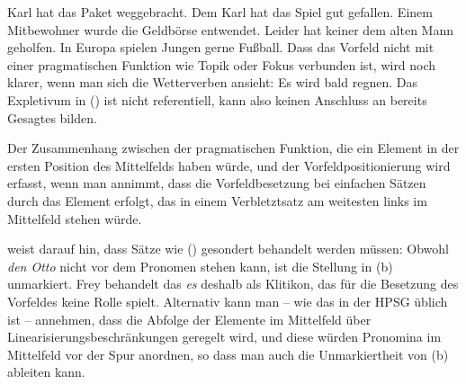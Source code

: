\eal
\label{bsp-voranstellung-pragmatik}
\ex Karl hat das Paket weggebracht.
\ex Dem Karl hat das Spiel gut gefallen.
\ex Einem Mitbewohner wurde die Geldbörse entwendet.
\ex Leider hat keiner dem alten Mann geholfen.
\ex In Europa spielen Jungen gerne Fußball.
\zl
Dass das Vorfeld nicht mit einer pragmatischen Funktion wie Topik oder Fokus verbunden ist,
wird noch klarer, wenn man sich die Wetterverben ansieht:
\ea
Es wird bald regnen.
\z
Das Expletivum in () ist nicht referentiell, kann also keinen Anschluss an bereits Gesagtes bilden.

Der Zusammenhang zwischen der pragmatischen Funktion, die ein Element in der ersten Position des Mittelfelds
haben würde, und der Vorfeldpositionierung wird erfasst, wenn man annimmt, 
dass die Vorfeldbesetzung bei einfachen Sätzen durch das Element erfolgt,
das in einem Verbletztsatz am weitesten links im Mittelfeld stehen würde.

\citet[]{Frey2004a} weist darauf hin, dass Sätze wie () gesondert behandelt werden müssen:
\eal
{}
\zl
Obwohl \emph{den Otto} nicht vor dem Pronomen stehen kann, ist die Stellung in (b) unmarkiert.
Frey behandelt das \emph{es} deshalb als Klitikon, das für die Besetzung des Vorfeldes keine Rolle
spielt. Alternativ kann man -- wie das in der HPSG üblich ist -- annehmen, dass die Abfolge der Elemente
im Mittelfeld über Linearisierungsbeschränkungen geregelt wird, und diese würden Pronomina im Mittelfeld
vor der Spur anordnen, so dass man auch die Unmarkiertheit von (b) ableiten kann.%
%
%


